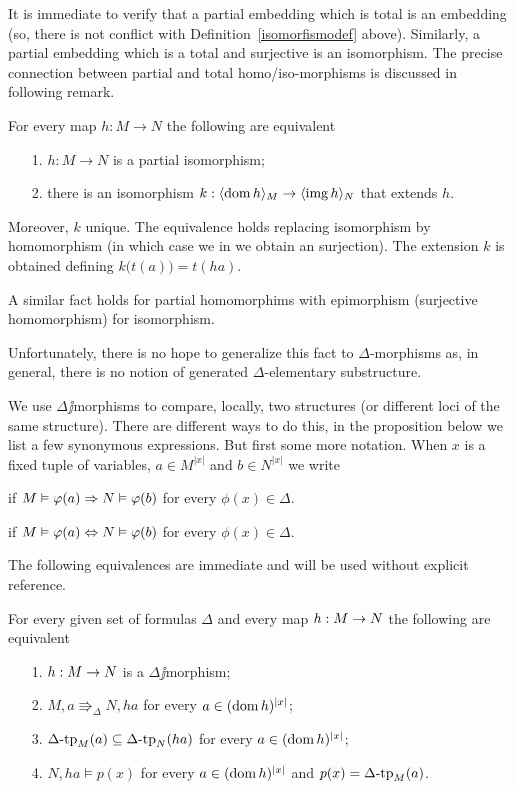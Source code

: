 \documentclass[creche.tex]{subfiles}
\begin{document}
It is immediate to verify that a partial embedding which is total is an embedding (so, there is not conflict with Definition~\ref{isomorfismodef} above). Similarly, a partial embedding which is a total and surjective is an isomorphism. The precise connection between partial and total homo/iso-morphisms is discussed in following remark.


\begin{remark}\label{rem_extension_homo}
For every map  $h:M\to N$ the following are equivalent
\begin{itemize}
\item[1.] $h:M\to N$ is a partial isomorphism;
\item[2.] there is an isomorphism $k:\langle\mathop{\rm dom} h\rangle_M\to\langle\mathop{\rm img} h\rangle_N$ that extends $h$.
\end{itemize}
Moreover, $k$ unique. The equivalence holds replacing isomorphism by homomorphism (in which case we in  we obtain an surjection). The extension $k$ is obtained defining $k\big(t(a)\big)=t(ha)$.

A similar fact holds for partial homomorphims with epimorphism (surjective homomorphism) for isomorphism.

Unfortunately, there is no hope to generalize this fact to $\Delta$-morphisms as, in general, there is no notion of generated $\Delta$-elementary substructure.\QED
\end{remark}


We use $\Delta\jj$morphisms to compare, locally, two structures (or different loci of the same structure). There are different ways to do this, in the proposition below we list a few synonymous expressions. But first some more notation. When $x$ is a fixed tuple of variables, $a\in M^{|x|}$ and $b\in N^{|x|}$ we write

\hfill if $M\vDash\varphi(a)\Rightarrow N\vDash\varphi(b)$ for every $\phi(x)\in\Delta$.

\hfill if $M\vDash\varphi(a)\Leftrightarrow N\vDash\varphi(b)$ for every $\phi(x)\in\Delta$.

The following equivalences are immediate and will be used without explicit reference.

\begin{proposition}\label{oss_Delta-morfismi}
For every given set of formulas $\Delta$ and every map $h:M\rightarrow N$ the following are equivalent
\begin{itemize}
\item[1.] $h:M\rightarrow N$ is a $\Delta\jj$morphism;
\item[2.] $M,a\Rrightarrow_\Delta N,ha$  for every $a\in(\mathop{\rm dom} h)^{|x|}$;
\item[3.] $\Delta\mbox{-}\textrm{tp}_M(a)\subseteq\Delta\mbox{-}\textrm{tp}_N(ha)$ for every $a\in(\mathop{\rm dom} h)^{|x|}$;
\item[4.] $N,ha\models p(x)$ for every $a\in(\mathop{\rm dom} h)^{|x|}$ and $p(x)=\Delta\mbox{-}\textrm{tp}_M(a)$.\QED
\end{itemize}
\end{proposition}
\end{document}
